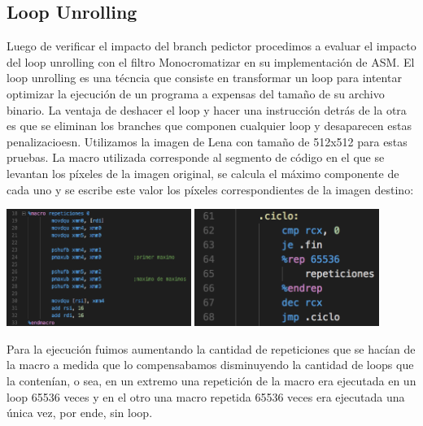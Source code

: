 \newpage
\subsection{Loop Unrolling}

Luego de verificar el impacto del branch pedictor procedimos a evaluar el impacto del loop unrolling con el filtro Monocromatizar en su implementación de ASM. El loop unrolling es una técncia que consiste en transformar un loop para intentar optimizar la ejecución de un programa a expensas del tamaño de su archivo binario. La ventaja de deshacer el loop y hacer una instrucción detrás de la otra es que se eliminan los branches que componen cualquier loop y desaparecen estas penalizacioesn. Utilizamos la imagen de Lena con tamaño de 512x512 para estas pruebas. La macro utilizada corresponde al segmento de código en el que se levantan los píxeles de la imagen original, se calcula el máximo componente de cada uno y se escribe este valor los píxeles correspondientes de la imagen destino:

\begin{center}

	\includegraphics[width=0.45\textwidth]{imagenes/loopunrolling/macro.png}
	\includegraphics[width=0.45\textwidth]{imagenes/loopunrolling/reps.png}

\end{center}

Para la ejecución fuimos aumentando la cantidad de repeticiones que se hacían de la macro a medida que lo compensabamos disminuyendo la cantidad de loops que la contenían, o sea, en un extremo una repetición de la macro era ejecutada en un loop 65536 veces y en el otro una macro repetida 65536 veces era ejecutada una única vez, por ende, sin loop.


